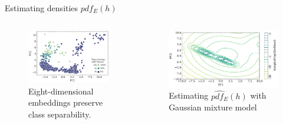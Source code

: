 \documentclass[t]{beamer}
\theoremstyle{definition}
\begin{document}
\begin{frame}{Estimating densities $pdf_E(h)$}
\begin{columns}[t]
    \begin{column}{0.382\textwidth}
       
    \begin{figure}
            \centering
            \includegraphics[width=\textwidth]{figs/embeddings_double.pdf}
            \caption{Eight-dimensional embeddings preserve class separability.}
            \label{fig:my_label}
        \end{figure}        
    \end{column}
    \begin{column}{0.618\textwidth}

    \begin{figure}
            \centering
            \includegraphics[width=\textwidth]{figs/de_pc1_pc2.pdf}
            \caption{Estimating $\hat{pdf_E}(h)$ with Gaussian mixture model}
            \label{fig:my_label}
        \end{figure}
        
        
    \end{column}
    \end{columns}

    
\end{frame}
\end{document}
